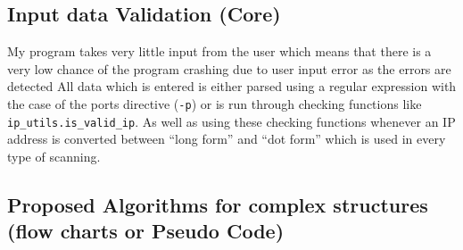 \documentclass[titlepage]{article}
\begin{document}
\subsection{Input data Validation (Core)}

My program takes very little input from the user which means that there is a very low chance of the program
crashing due to user input error as the errors are detected
All data which is entered is either parsed using a regular expression with the case of the
ports directive (\verb|-p|) or is run through checking functions like \verb|ip_utils.is_valid_ip|.
As well as using these checking functions whenever an IP address is converted between ``long form''
and ``dot form'' which is used in every type of scanning.

\subsection{Proposed Algorithms for complex structures (flow charts or Pseudo Code)}
\end{document}
